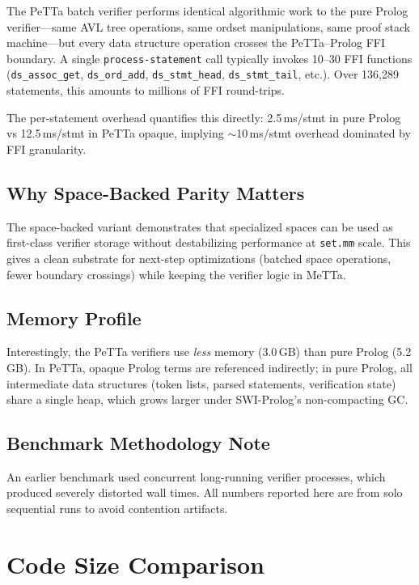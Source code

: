 \documentclass[11pt]{article}
\begin{document}
The PeTTa batch verifier performs identical algorithmic work to
the pure Prolog verifier---same AVL tree operations, same ordset
manipulations, same proof stack machine---but every data structure
operation crosses the PeTTa--Prolog FFI boundary.  A single
\texttt{process-statement} call typically invokes 10--30 FFI
functions (\texttt{ds\_assoc\_get}, \texttt{ds\_ord\_add},
\texttt{ds\_stmt\_head}, \texttt{ds\_stmt\_tail}, etc.).
Over 136{,}289 statements, this amounts to millions of FFI
round-trips.

The per-statement overhead quantifies this directly:
2.5\,ms/stmt in pure Prolog vs 12.5\,ms/stmt in PeTTa opaque,
implying $\sim$10\,ms/stmt overhead dominated by FFI granularity.

\subsection{Why Space-Backed Parity Matters}

The space-backed variant demonstrates that specialized spaces can be
used as first-class verifier storage without destabilizing performance
at \texttt{set.mm} scale.
This gives a clean substrate for next-step optimizations (batched
space operations, fewer boundary crossings) while keeping the verifier
logic in MeTTa.

\subsection{Memory Profile}

Interestingly, the PeTTa verifiers use \emph{less} memory
(3.0\,GB) than pure Prolog (5.2\,GB).  In PeTTa, opaque Prolog
terms are referenced indirectly; in pure Prolog, all intermediate
data structures (token lists, parsed statements, verification
state) share a single heap, which grows larger under
SWI-Prolog's non-compacting GC.

\subsection{Benchmark Methodology Note}

An earlier benchmark used concurrent long-running verifier processes,
which produced severely distorted wall times.
All numbers reported here are from solo sequential runs to avoid
contention artifacts.

\section{Code Size Comparison}
\label{sec:codesize}
\end{document}
